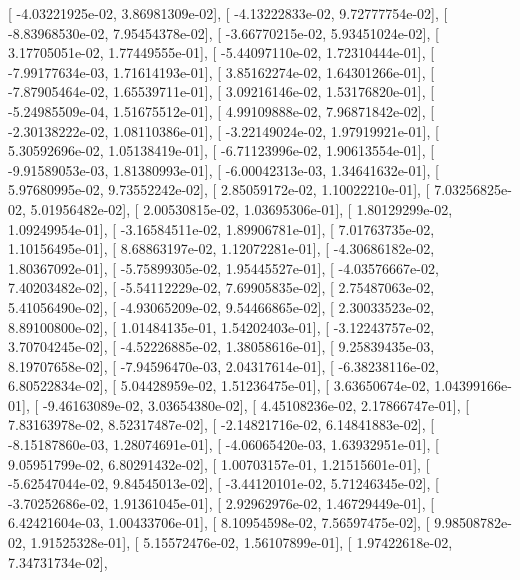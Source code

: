 \documentclass{article}
\begin{document}
       [ -4.03221925e-02,   3.86981309e-02],
       [ -4.13222833e-02,   9.72777754e-02],
       [ -8.83968530e-02,   7.95454378e-02],
       [ -3.66770215e-02,   5.93451024e-02],
       [  3.17705051e-02,   1.77449555e-01],
       [ -5.44097110e-02,   1.72310444e-01],
       [ -7.99177634e-03,   1.71614193e-01],
       [  3.85162274e-02,   1.64301266e-01],
       [ -7.87905464e-02,   1.65539711e-01],
       [  3.09216146e-02,   1.53176820e-01],
       [ -5.24985509e-04,   1.51675512e-01],
       [  4.99109888e-02,   7.96871842e-02],
       [ -2.30138222e-02,   1.08110386e-01],
       [ -3.22149024e-02,   1.97919921e-01],
       [  5.30592696e-02,   1.05138419e-01],
       [ -6.71123996e-02,   1.90613554e-01],
       [ -9.91589053e-03,   1.81380993e-01],
       [ -6.00042313e-03,   1.34641632e-01],
       [  5.97680995e-02,   9.73552242e-02],
       [  2.85059172e-02,   1.10022210e-01],
       [  7.03256825e-02,   5.01956482e-02],
       [  2.00530815e-02,   1.03695306e-01],
       [  1.80129299e-02,   1.09249954e-01],
       [ -3.16584511e-02,   1.89906781e-01],
       [  7.01763735e-02,   1.10156495e-01],
       [  8.68863197e-02,   1.12072281e-01],
       [ -4.30686182e-02,   1.80367092e-01],
       [ -5.75899305e-02,   1.95445527e-01],
       [ -4.03576667e-02,   7.40203482e-02],
       [ -5.54112229e-02,   7.69905835e-02],
       [  2.75487063e-02,   5.41056490e-02],
       [ -4.93065209e-02,   9.54466865e-02],
       [  2.30033523e-02,   8.89100800e-02],
       [  1.01484135e-01,   1.54202403e-01],
       [ -3.12243757e-02,   3.70704245e-02],
       [ -4.52226885e-02,   1.38058616e-01],
       [  9.25839435e-03,   8.19707658e-02],
       [ -7.94596470e-03,   2.04317614e-01],
       [ -6.38238116e-02,   6.80522834e-02],
       [  5.04428959e-02,   1.51236475e-01],
       [  3.63650674e-02,   1.04399166e-01],
       [ -9.46163089e-02,   3.03654380e-02],
       [  4.45108236e-02,   2.17866747e-01],
       [  7.83163978e-02,   8.52317487e-02],
       [ -2.14821716e-02,   6.14841883e-02],
       [ -8.15187860e-03,   1.28074691e-01],
       [ -4.06065420e-03,   1.63932951e-01],
       [  9.05951799e-02,   6.80291432e-02],
       [  1.00703157e-01,   1.21515601e-01],
       [ -5.62547044e-02,   9.84545013e-02],
       [ -3.44120101e-02,   5.71246345e-02],
       [ -3.70252686e-02,   1.91361045e-01],
       [  2.92962976e-02,   1.46729449e-01],
       [  6.42421604e-03,   1.00433706e-01],
       [  8.10954598e-02,   7.56597475e-02],
       [  9.98508782e-02,   1.91525328e-01],
       [  5.15572476e-02,   1.56107899e-01],
       [  1.97422618e-02,   7.34731734e-02],
\end{document}
